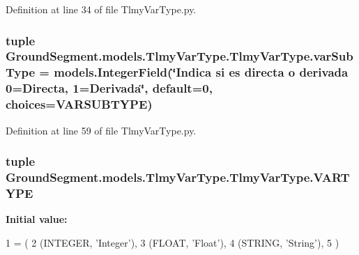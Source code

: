 Definition at line 34 of file Tlmy\+Var\+Type.\+py.

\hypertarget{class_ground_segment_1_1models_1_1_tlmy_var_type_1_1_tlmy_var_type_ad7c03c17c8743df66707b060faeb94a3}{}
\subsubsection[{var\+Sub\+Type}]{\setlength{\rightskip}{0pt plus 5cm}tuple Ground\+Segment.\+models.\+Tlmy\+Var\+Type.\+Tlmy\+Var\+Type.\+var\+Sub\+Type = models.\+Integer\+Field(\char`\"{}Indica si es directa o derivada 0=Directa, 1=Derivada\char`\"{}, default=0, choices={\bf V\+A\+R\+S\+U\+B\+T\+Y\+P\+E})\hspace{0.3cm}{\ttfamily [static]}}\label{class_ground_segment_1_1models_1_1_tlmy_var_type_1_1_tlmy_var_type_ad7c03c17c8743df66707b060faeb94a3}


Definition at line 59 of file Tlmy\+Var\+Type.\+py.

\hypertarget{class_ground_segment_1_1models_1_1_tlmy_var_type_1_1_tlmy_var_type_a9a9b6dcda859afbf512855888fd787fa}{}
\subsubsection[{V\+A\+R\+T\+Y\+P\+E}]{\setlength{\rightskip}{0pt plus 5cm}tuple Ground\+Segment.\+models.\+Tlmy\+Var\+Type.\+Tlmy\+Var\+Type.\+V\+A\+R\+T\+Y\+P\+E\hspace{0.3cm}{\ttfamily [static]}}\label{class_ground_segment_1_1models_1_1_tlmy_var_type_1_1_tlmy_var_type_a9a9b6dcda859afbf512855888fd787fa}
{\bfseries Initial value\+:}
\begin{DoxyCode}
1 = (
2         (INTEGER, \textcolor{stringliteral}{'Integer'}),
3         (FLOAT, \textcolor{stringliteral}{'Float'}),
4         (STRING, \textcolor{stringliteral}{'String'}),
5     )
\end{DoxyCode}



